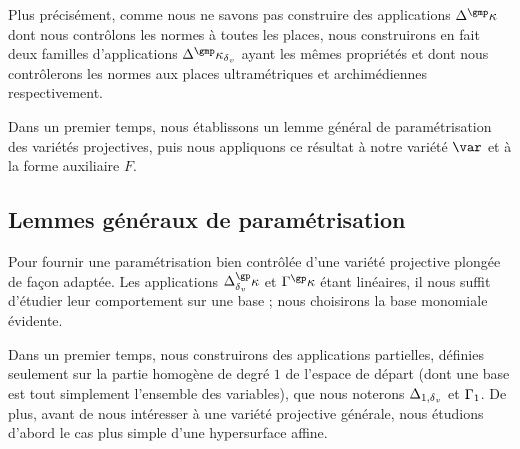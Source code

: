 \medskip

Plus précisément, comme nous ne savons pas construire des applications
\( \pmnum^\dermp \) dont nous contrôlons les normes à toutes les places, nous
construirons en fait deux familles d'applications \( \pmnum^\dermp_\dv \)
ayant les mêmes propriétés et dont nous contrôlerons les normes aux places
ultramétriques et archimédiennes respectivement.

Dans un premier temps, nous établissons un lemme général de paramétrisation
des variétés projectives, puis nous appliquons ce résultat à notre variété
\( \var \) et à la forme auxiliaire \( F \).


\subsection{Lemmes généraux de paramétrisation} \label{sub:param-gene}

Pour fournir une paramétrisation bien contrôlée
d'une variété projective plongée de façon adaptée. Les applications
\( \pmnum_\dv^\derp \) et \( \pmden^\derp \) étant linéaires, il nous suffit
d'étudier leur comportement sur une base ; nous choisirons la base monomiale
évidente.

Dans un premier temps, nous construirons des applications partielles,
définies seulement sur la partie homogène de degré \( 1 \) de l'espace de
départ (dont une base est tout simplement l'ensemble des variables), que nous
noterons
\( \Delta_{1, {\delta\smash{_v}}} \) et \( \Gamma_1 \).  De plus, avant de nous intéresser à
une variété projective générale, nous étudions d'abord le cas plus simple
d'une hypersurface affine.


